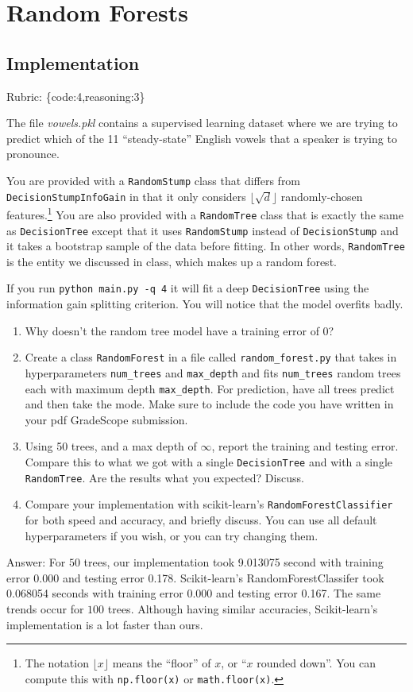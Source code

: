 \documentclass{article}
\def\rubric#1{\gre{Rubric: \{#1\}}}{}
\def\blu#1{{\color{blu}#1}}
\def\gre#1{{\color{gre}#1}}
\def\enum#1{\begin{enumerate}#1\end{enumerate}}
\def\ans#1{\gre{Answer: #1}}{}
\begin{document}
\section{Random Forests}

\subsection{Implementation}
\rubric{code:4,reasoning:3}

The file \emph{vowels.pkl} contains a supervised learning dataset where we are trying to predict which of the 11 ``steady-state'' English vowels that a speaker is trying to pronounce.

You are provided with a \texttt{RandomStump} class that differs from
\texttt{DecisionStumpInfoGain} in that
it only considers $\lfloor \sqrt{d} \rfloor$ randomly-chosen features.\footnote{The notation $\lfloor x\rfloor$ means the ``floor'' of $x$, or ``$x$ rounded down''. You can compute this with \texttt{np.floor(x)} or \texttt{math.floor(x)}.}
You are also provided with a \texttt{RandomTree} class that is exactly the same as
\texttt{DecisionTree} except that it uses \texttt{RandomStump} instead of
\texttt{DecisionStump} and it takes a bootstrap sample of the data before fitting.
In other words, \texttt{RandomTree} is the entity we discussed in class, which
makes up a random forest.

If you run \texttt{python main.py -q 4} it will fit a deep \texttt{DecisionTree}
using the information gain splitting criterion. You will notice that the model overfits badly.




\blu{
\enum{
\item Why doesn't the random tree model have a training error of 0?
\item Create a class \texttt{RandomForest} in a file called \texttt{random\string_forest.py} that takes in hyperparameters \texttt{num\string_trees} and \texttt{max\string_depth} and
fits \texttt{num\string_trees} random trees each with maximum depth \texttt{max\string_depth}. For prediction, have all trees predict and then take the mode. Make sure to include the code you have written in your pdf GradeScope submission.
\item Using 50 trees, and a max depth of $\infty$, report the training and testing error. Compare this to what we got with a single \texttt{DecisionTree} and with a single \texttt{RandomTree}. Are the results what you expected? Discuss.
\item Compare your implementation with scikit-learn's \texttt{RandomForestClassifier} for both speed and accuracy, and briefly discuss. You can use all default hyperparameters if you wish, or you can try changing them.
}
}
\ans{For $50$ trees, our implementation took 9.013075 second with training error 0.000 and testing error 0.178. Scikit-learn's RandomForestClassifer took 0.068054 seconds with training error 0.000 and testing error 0.167. The same trends occur for $100$ trees. Although having similar accuracies, Scikit-learn's implementation is a lot faster than ours.}
\end{document}
